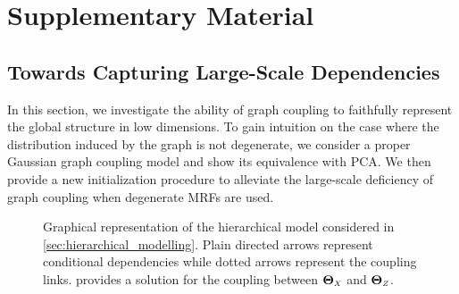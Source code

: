 
\section{Supplementary Material}\label{sec:supp_material_gc}

\subsection{Towards Capturing Large-Scale Dependencies}\label{sec:towards_large_scale}

In this section, we investigate the ability of graph coupling to faithfully represent the global structure in low dimensions. To gain intuition on the case where the distribution induced by the graph is not degenerate, we consider a proper Gaussian graph coupling model and show its equivalence with PCA. We then provide a new initialization procedure to alleviate the large-scale deficiency of graph coupling when degenerate MRFs are used.

\begin{figure}
    \centering
    \caption{Graphical representation of the hierarchical model considered in \cref{sec:hierarchical_modelling}. Plain directed arrows represent conditional dependencies while dotted arrows represent the coupling links.  provides a solution for the coupling between $\bm{\Theta}_{\scaleto{X}{4pt}}$ and $\bm{\Theta}_{\scaleto{Z}{4pt}}$.}
    \label{fig:graphical_model_hierarchical}
\end{figure}

